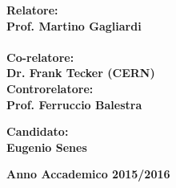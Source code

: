 \begin{titlepage}
\noindent
\begin{minipage}[t]{0.47\textwidth}
{\large{\bf Relatore:\\
Prof. Martino Gagliardi}}\\
\vspace{4mm}
\\
{\large{\bf Co-relatore:\\
Dr. Frank Tecker (CERN)}}
\vspace{8mm}
{\large{\bf \\ Controrelatore:\\
Prof. Ferruccio Balestra}}
\end{minipage}
\hfill
\begin{minipage}[t]{0.47\textwidth}\raggedleft
\vspace{16mm}
{\large{\bf Candidato:\\
Eugenio Senes}}
\end{minipage}
\vspace{9mm}
\begin{center}
{\large{\bf 
Anno Accademico 2015/2016}}
\end{center}

\end{titlepage}